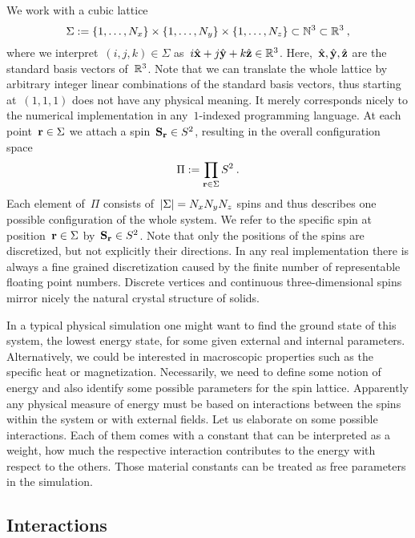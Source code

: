 We work with a cubic lattice
%
\begin{equation}
  \Sigma := \{1,\dots,N_x\} \times \{1,\dots,N_y\} \times
  \{1,\dots,N_z\} \subset \mathbb{N}^3 \subset \mathbb{R}^3\:,
\end{equation}
%
where we interpret~$(i,j,k) \in \Sigma$ as~$i \hat{\mathbf{x}} + j \hat{\mathbf{y}} + k \hat{\mathbf{z}}
\in \mathbb{R}^3$. Here,~$\hat{\mathbf{x}}, \hat{\mathbf{y}}, \hat{\mathbf{z}}$ are the standard basis vectors of~$\mathbb{R}^3$.
Note that we can translate the whole lattice by arbitrary integer linear
combinations of the standard basis vectors, thus starting at~$(1,1,1)$ does not
have any physical meaning. It merely corresponds nicely to the numerical
implementation in any~$1$-indexed programming language. At each point~$\mathbf{r} \in
\Sigma$ we attach a spin~$\mathbf{S}_{\mathbf{r}} \in S^2$, resulting in the overall
configuration space
%
\begin{equation}
  \Pi := \prod_{\mathbf{r} \in \Sigma} S^2\:.
\end{equation}
%
Each element of~$\Pi$ consists of~$\abs{\Sigma}=N_x N_y N_z$ spins and thus
describes one possible configuration of the whole system. We refer to the
specific spin at position~$\mathbf{r} \in \Sigma$ by~$\mathbf{S}_{\mathbf{r}} \in S^2$. Note that only
the positions of the spins are discretized, but not explicitly their directions.
In any real implementation there is always a fine grained discretization caused
by the finite number of representable floating point numbers. Discrete vertices
and continuous three-dimensional spins mirror nicely the natural crystal
structure of solids.

In a typical physical simulation one might want to find the ground state of this
system, \ie{} the lowest energy state, for some given external and internal
parameters. Alternatively, we could be interested in macroscopic properties such
as the specific heat or magnetization. Necessarily, we need to define some
notion of energy and also identify some possible parameters for the spin
lattice. Apparently any physical measure of energy must be based on interactions
between the spins within the system or with external fields. Let us elaborate on
some possible interactions. Each of them comes with a constant that can be
interpreted as a weight, \ie{} how much the respective interaction contributes
to the energy with respect to the others. Those material constants can be
treated as free parameters in the simulation.

\subsection{Interactions}

